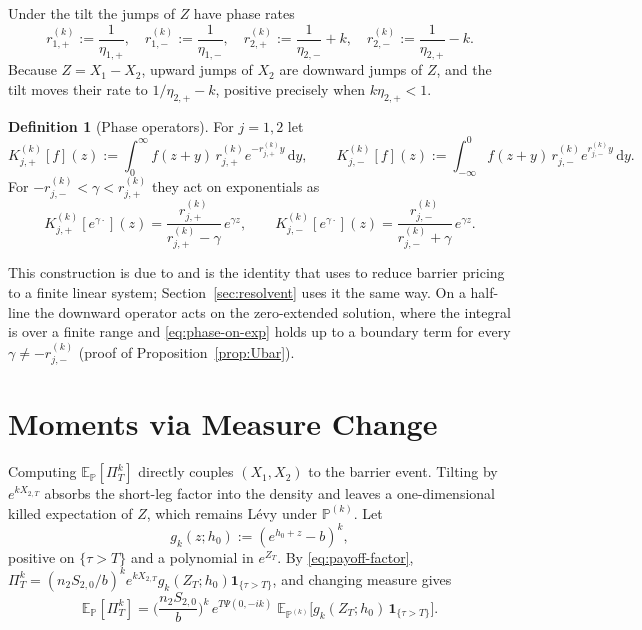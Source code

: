 \documentclass[11pt]{article}
\newcommand{\E}{\mathbb{E}}
\renewcommand{\P}{\mathbb{P}}
\newcommand{\diff}{\mathrm{d}}
\newcommand{\one}{\mathbf{1}}
\theoremstyle{plain}
\theoremstyle{definition}
\newtheorem{definition}{Definition}[section]
\theoremstyle{remark}
\begin{document}
Under the tilt the jumps of $Z$ have phase rates
\[
r_{1,+}^{(k)}:=\frac{1}{\eta_{1,+}},
\quad
r_{1,-}^{(k)}:=\frac{1}{\eta_{1,-}},
\quad
r_{2,+}^{(k)}:=\frac{1}{\eta_{2,-}}+k,
\quad
r_{2,-}^{(k)}:=\frac{1}{\eta_{2,+}}-k.
\]
Because $Z=X_1-X_2$, upward jumps of $X_2$ are downward jumps of $Z$, and the tilt moves their rate
to $1/\eta_{2,+}-k$, positive precisely when $k\eta_{2,+}<1$.
\begin{definition}[Phase operators]\label{def:phase-ops}
For $j=1,2$ let
\[
K_{j,+}^{(k)}[f](z)
:=
\int_0^\infty f(z+y)\,r_{j,+}^{(k)}e^{-r_{j,+}^{(k)}y}\,\diff y,
\qquad
K_{j,-}^{(k)}[f](z)
:=
\int_{-\infty}^0 f(z+y)\,r_{j,-}^{(k)}e^{r_{j,-}^{(k)}y}\,\diff y.
\]
For $-r_{j,-}^{(k)}<\gamma<r_{j,+}^{(k)}$ they act on exponentials as
\begin{equation}\label{eq:phase-on-exp}
K_{j,+}^{(k)}[e^{\gamma\cdot}](z)
=
\frac{r_{j,+}^{(k)}}{r_{j,+}^{(k)}-\gamma}\,e^{\gamma z},
\qquad
K_{j,-}^{(k)}[e^{\gamma\cdot}](z)
=
\frac{r_{j,-}^{(k)}}{r_{j,-}^{(k)}+\gamma}\,e^{\gamma z}.
\end{equation}
\end{definition}
This construction is due to \citet{KouWang2003} and is the identity that \citet{Sepp2004} uses to
reduce barrier pricing to a finite linear system; Section~\ref{sec:resolvent} uses it the same way. On a half-line the downward operator acts on the zero-extended solution, where the integral is
over a finite range and \eqref{eq:phase-on-exp} holds up to a boundary term for every
$\gamma\neq-r_{j,-}^{(k)}$ (proof of Proposition~\ref{prop:Ubar}).

\section{Moments via Measure Change}\label{sec:moments}

Computing $\E_\P[\Pi_T^k]$ directly couples $(X_1,X_2)$ to the barrier event. Tilting by
$e^{kX_{2,T}}$ absorbs the short-leg factor into the density and leaves a one-dimensional killed
expectation of $Z$, which remains L\'evy under $\P^{(k)}$. Let
\[
g_k(z;h_0):=(e^{h_0+z}-b)^k,
\]
positive on $\{\tau>T\}$ and a polynomial in $e^{Z_T}$. By \eqref{eq:payoff-factor},
$\Pi_T^k=(n_2S_{2,0}/b)^k e^{kX_{2,T}}g_k(Z_T;h_0)\one_{\{\tau>T\}}$, and changing measure gives
\begin{equation}\label{eq:moment-reduction}
\E_{\P}[\Pi_T^k]
=
\Big(\frac{n_2S_{2,0}}{b}\Big)^k\,e^{T\Psi(0,-ik)}\;
\E_{\P^{(k)}}\!\Big[g_k(Z_T;h_0)\,\one_{\{\tau>T\}}\Big].
\end{equation}
\end{document}
